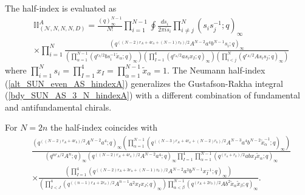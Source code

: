 \documentclass[12pt]{article}
\numberwithin{equation}{section}
\begin{document}
The half-index is evaluated as
\begin{align}
\label{alt_SUN_even_AS_hindexA}
&
\mathbb{II}_{(\mathcal{N},N,N,N,D)}^{A}
=
\frac{(q)_{\infty}^{N-1}}{N!} \prod_{i=1}^{N-1} \oint \frac{ds_i}{2\pi i s_i}
\prod_{i \ne j}^N (s_i s_j^{-1}; q)_{\infty} 
\nonumber \\
&\times \prod_{i = 1}^N \frac{(q^{((N-2)r_A + 4r_a + (N-1)r_b)/2} A^{N-2} a^4 b^{N-1} s_i; q)_{\infty}}{\left( \prod_{\alpha = 1}^{N-1} (q^{r_b/2} b s_i^{-1} \tilde{x}_{\alpha}; q)_{\infty} \right) \left( \prod_{I = 1}^4 (q^{r_a/2} a s_i x_I; q)_{\infty} \right) \left( \prod_{i < j}^N (q^{r_A/2} A s_i {s_j}; q)_{\infty} \right)}
\end{align}
where $\prod_{i=1}^N s_i = \prod_{I = 1}^4 x_I = \prod_{\alpha = 1}^{N-1} \tilde{x}_{\alpha} = 1$.
The Neumann half-index (\ref{alt_SUN_even_AS_hindexA}) generalizes the 
Gustafson-Rakha integral (\ref{bdy_SUN_AS_3_N_hindexA}) with a different combination of fundamental and antifundamental chirals. 

For $N = 2n$ the half-index coincides with 
\begin{align}
\label{alt_SUN_even_AS_hindexB1}
&
\frac{\left( q^{((N-2)r_A + 4r_b)/2} A^{N-2} a^4; q \right)_{\infty} \left( \prod_{\alpha = 1}^{N-1} \left( q^{((N-3)r_A + 4r_a + (N-2)r_b)/2} A^{N-3} a^4 b^{N-2} \tilde{x}_{\alpha}^{-1};q \right)_{\infty} \right)}
 {\left( q^{nr_A/2} A^n; q \right)_{\infty} \left( q^{((N-2)r_A + 4r_a)/2} A^{N-2} a^4; q \right)_{\infty} \prod_{I = 1}^4 \prod_{\alpha = 1}^{N-1} (q^{(r_a + r_b)/2} ab x_I \tilde{x}_{\alpha}; q)_{\infty}}
\nonumber \\
&\times \frac{\left( \prod_{I = 1}^4 \left( q^{((N-2)r_A + 3r_a + (N-1)r_b)/2} A^{N-2} a^3 b^{N-1} x_I^{-1};q \right)_{\infty} \right)}
 {\left( \prod_{I < J}^4 \left( q^{((n-1)r_A + 2r_a)/2} A^{n-1} a^2 x_I x_J; q \right)_{\infty} \right) \prod_{\alpha < \beta}^{N-1} (q^{(r_A + 2r_b)/2} A b^2 \tilde{x}_{\alpha} \tilde{x}_{\beta}; q)_{\infty}}. 
\end{align}
\end{document}
